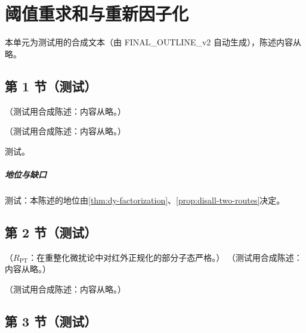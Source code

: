 \chapter{阈值重求和与重新因子化}\label{ch:thr}
本单元为测试用的合成文本（由 FINAL\_OUTLINE\_v2 自动生成），陈述内容从略。

\section{第 1 节（测试）}\label{sec:thr-limit}

\begin{definition}[部分子阈值与强子阈值]\label{def:thr-limit}
（测试用合成陈述：内容从略。）
\end{definition}

\begin{theorem}\label{thm:thr-refactorization}
（测试用合成陈述：内容从略。）
\end{theorem}
\begin{proofsketch}测试。\end{proofsketch}
\paragraph{地位与缺口}测试：本陈述的地位由\cref{thm:dy-factorization}、\cref{prop:disall-two-routes}决定。

\section{第 2 节（测试）}\label{sec:thr-refactorization}

\begin{proposition}\label{prop:thr-oneloop}
（$R_{\mathrm{PT}}$：在重整化微扰论中对红外正规化的部分子态严格。）
（测试用合成陈述：内容从略。）
\end{proposition}

\begin{remark}\label{rem:thr-prescriptions}
（测试用合成陈述：内容从略。）
\end{remark}

\section{第 3 节（测试）}\label{sec:thr-check}

